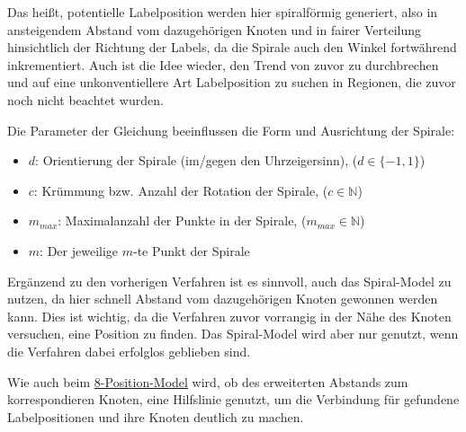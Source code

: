 Das heißt, potentielle Labelposition werden hier spiralförmig generiert, also in ansteigendem Abstand vom dazugehörigen Knoten und in fairer Verteilung hinsichtlich der Richtung der Labels, da die Spirale auch den Winkel fortwährend inkrementiert.
Auch ist die Idee wieder, den Trend von zuvor zu durchbrechen und auf eine unkonventiellere Art Labelposition zu suchen in Regionen, die zuvor noch nicht beachtet wurden.

Die Parameter der Gleichung beeinflussen die Form und Ausrichtung der Spirale:
\begin{itemize}
    \item $d$: Orientierung der Spirale (im/gegen den Uhrzeigersinn), ($d \in \{-1, 1 \}$)
    \item $c$: Krümmung bzw. Anzahl der Rotation der Spirale, ($c \in \mathbb{N}$)
    \item $m_{max}$: Maximalanzahl der Punkte in der Spirale, ($m_{max} \in \mathbb{N}$)
    \item $m$: Der jeweilige $m$-te Punkt der Spirale
\end{itemize}

Ergänzend zu den vorherigen Verfahren ist es sinnvoll, auch das Spiral-Model zu nutzen, da hier schnell Abstand vom dazugehörigen Knoten gewonnen werden kann.
Dies ist wichtig, da die Verfahren zuvor vorrangig in der Nähe des Knoten versuchen, eine Position zu finden. Das Spiral-Model wird aber nur genutzt,
wenn die Verfahren dabei erfolglos geblieben sind.

Wie auch beim \hyperref[subsubsec:8pos]{8-Position-Model} wird, ob des erweiterten Abstands zum korrespondieren Knoten, eine Hilfslinie genutzt,
um die Verbindung für gefundene Labelpositionen und ihre Knoten deutlich zu machen.